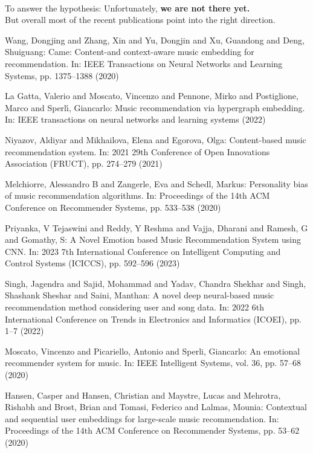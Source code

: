 \documentclass[runningheads,a4paper]{llncs}
\begin{document}
\\
To answer the hypothesis: 
Unfortunately, \textbf{we are not there yet.} \\
But overall most of the recent publications point into the right direction.  
\newpage
\begin{thebibliography}{4}

 Wang, Dongjing and Zhang, Xin and Yu, Dongjin and Xu, Guandong and Deng, Shuiguang: 
Came: Content-and context-aware music embedding for recommendation. In: IEEE Transactions on Neural Networks and Learning Systems,
pp. 1375--1388 (2020)

 La Gatta, Valerio and Moscato, Vincenzo and Pennone, Mirko and Postiglione, Marco and Sperl{\'\i}, Giancarlo:
Music recommendation via hypergraph embedding. In: IEEE transactions on neural networks and learning systems (2022)

 Niyazov, Aldiyar and Mikhailova, Elena and Egorova, Olga:
Content-based music recommendation system. In: 2021 29th Conference of Open Innovations Association (FRUCT),
pp. 274--279 (2021)

 Melchiorre, Alessandro B and Zangerle, Eva and Schedl, Markus:
Personality bias of music recommendation algorithms. In: Proceedings of the 14th ACM Conference on Recommender Systems, 
pp. 533--538 (2020)

 Priyanka, V Tejaswini and Reddy, Y Reshma and Vajja, Dharani and Ramesh, G and Gomathy, S:
A Novel Emotion based Music Recommendation System using CNN. In: 2023 7th International Conference on Intelligent Computing and Control Systems (ICICCS),
pp. 592--596 (2023)

 Singh, Jagendra and Sajid, Mohammad and Yadav, Chandra Shekhar and Singh, Shashank Sheshar and Saini, Manthan:
A novel deep neural-based music recommendation method considering user and song data. In: 2022 6th International Conference on Trends in Electronics and Informatics (ICOEI),
pp. 1--7 (2022)

 Moscato, Vincenzo and Picariello, Antonio and Sperli, Giancarlo:
An emotional recommender system for music. In: IEEE Intelligent Systems, vol. 36, pp. 57--68 (2020)

 Hansen, Casper and Hansen, Christian and Maystre, Lucas and Mehrotra, Rishabh and Brost, Brian and Tomasi, Federico and Lalmas, Mounia:
Contextual and sequential user embeddings for large-scale music recommendation. In: 
Proceedings of the 14th ACM Conference on Recommender Systems, pp. 53--62 (2020)


\end{thebibliography}
\end{document}

